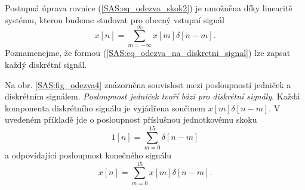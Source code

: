 {      Postupná úprava rovnice (\ref{SAS:eq_odezva_skok2}) je umožněna díky linearitě systému,
      kterou budeme studovat pro obecný vstupní signál
      \begin{equation}\label{SAS:eq_odezva_na_diskretni_signal}
        x[n]=\sum_{m=-\infty}^\infty x[m]\delta[n-m].
      \end{equation}
      Poznamenejme, že formou (\ref{SAS:eq_odezva_na_diskretni_signal}) lze zapsat každý diskrétní
      signál.
     
      
      
      Na obr. \ref{SAS:fig_odezva4} znázorněna souvislost mezi posloupností jedniček a diskrétním
      sig\-ná\-lem. \emph{Posloupnost jedniček tvoří bázi pro diskrétní signály}. Každá komponenta
      diskrétního signálu je vyjádřena součinem $x[m]\delta[n-m]$. V uvedeném příkladě jde o
      posloupnost příslušnou jednotkovému skoku
      \begin{equation}\label{SAS:eq_odezva5}
        1[n]=\sum_{m=0}^{15}\delta[n-m]
      \end{equation}
      a odpovídající posloupnost konečného signálu
      \begin{equation}\label{SAS:eq_odezva6}
        x[n]=\sum_{m=0}^{15}x[m]\delta[n-m].
      \end{equation}
  
}
